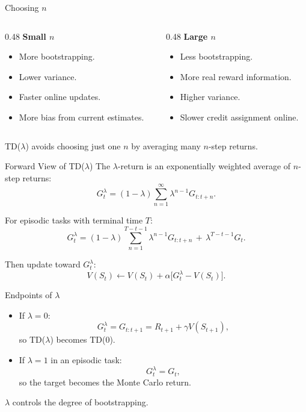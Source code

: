 \documentclass[aspectratio=169]{beamer}
\begin{document}
\begin{frame}{Choosing $n$}
\small
\begin{columns}[T,onlytextwidth]
\begin{column}{0.48\textwidth}
\textbf{Small $n$}
\begin{itemize}
    \item More bootstrapping.
    \item Lower variance.
    \item Faster online updates.
    \item More bias from current estimates.
\end{itemize}
\end{column}
\begin{column}{0.48\textwidth}
\textbf{Large $n$}
\begin{itemize}
    \item Less bootstrapping.
    \item More real reward information.
    \item Higher variance.
    \item Slower credit assignment online.
\end{itemize}
\end{column}
\end{columns}

\vspace{0.8em}
TD($\lambda$) avoids choosing just one $n$ by averaging many $n$-step returns.
\end{frame}

\begin{frame}{Forward View of TD($\lambda$)}
\small
The $\lambda$-return is an exponentially weighted average of $n$-step returns:
\[
G_t^\lambda=(1-\lambda)\sum_{n=1}^{\infty}\lambda^{n-1}G_{t:t+n}.
\]

\vspace{0.7em}
For episodic tasks with terminal time $T$:
\[
G_t^\lambda=(1-\lambda)\sum_{n=1}^{T-t-1}\lambda^{n-1}G_{t:t+n}
\,+\,\lambda^{T-t-1}G_t.
\]

\vspace{0.4em}
Then update toward $G_t^\lambda$:
\[
V(S_t)\leftarrow V(S_t)+\alpha\bigl[G_t^\lambda-V(S_t)\bigr].
\]
\end{frame}

\begin{frame}{Endpoints of $\lambda$}
\small
\begin{itemize}
    \item If $\lambda=0$:
    \[
    G_t^\lambda=G_{t:t+1}=R_{t+1}+\gamma V(S_{t+1}),
    \]
    so TD($\lambda$) becomes TD(0).
    \item If $\lambda=1$ in an episodic task:
    \[
    G_t^\lambda=G_t,
    \]
    so the target becomes the Monte Carlo return.
\end{itemize}

\vspace{0.7em}
$\lambda$ controls the degree of bootstrapping.
\end{frame}
\end{document}
